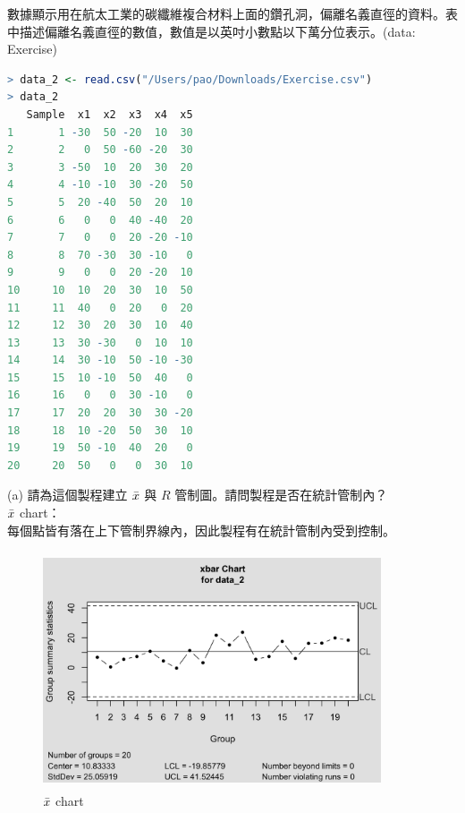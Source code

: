 數據顯示用在航太工業的碳纖維複合材料上面的鑽孔洞，偏離名義直徑的資料。表中描述偏離名義直徑的數值，數值是以英吋小數點以下萬分位表示。(data: Exercise)
\begin{lstlisting}[language=R]
> data_2 <- read.csv("/Users/pao/Downloads/Exercise.csv")
> data_2
   Sample  x1  x2  x3  x4  x5
1       1 -30  50 -20  10  30
2       2   0  50 -60 -20  30
3       3 -50  10  20  30  20
4       4 -10 -10  30 -20  50
5       5  20 -40  50  20  10
6       6   0   0  40 -40  20
7       7   0   0  20 -20 -10
8       8  70 -30  30 -10   0
9       9   0   0  20 -20  10
10     10  10  20  30  10  50
11     11  40   0  20   0  20
12     12  30  20  30  10  40
13     13  30 -30   0  10  10
14     14  30 -10  50 -10 -30
15     15  10 -10  50  40   0
16     16   0   0  30 -10   0
17     17  20  20  30  30 -20
18     18  10 -20  50  30  10
19     19  50 -10  40  20   0
20     20  50   0   0  30  10
\end{lstlisting}


(a) 請為這個製程建立 $\Bar{x}$ 與 $R$ 管制圖。請問製程是否在統計管制內？\\
    $\Bar{x}$ chart：\\
    每個點皆有落在上下管制界線內，因此製程有在統計管制內受到控制。
        \begin{figure}[ht]
            \centering
            \includegraphics[width=10cm, height=7cm]{figures/Xbar_Chart_2.png}
            \caption{$\Bar{x}$ chart}
            \label{fig:3}
        \end{figure}

